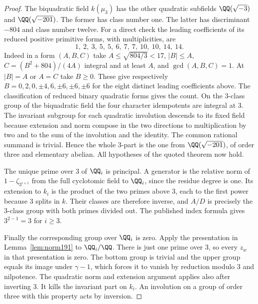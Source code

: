 \documentclass[a4paper,11pt]{article}
\theoremstyle{definition}
\theoremstyle{remark}
\numberwithin{equation}{section}
\begin{document}
\begin{proof}
The biquadratic field \(k(\mu_3)\) has the other quadratic
subfields \(\QQ(\sqrt{-3})\) and \(\QQ(\sqrt{-201})\).
The former has class number one. The latter has discriminant
\(-804\) and class number twelve. For a direct check the leading
coefficients of its reduced positive primitive forms, with
multiplicities, are
\[
        1,\ 2,\ 3,\ 5,\ 5,\ 6,\ 7,\ 7,\ 10,\ 10,\ 14,\ 14 .
\]
Indeed in a form \((A,B,C)\) take \(A\le\sqrt{804/3}<17\),
\(|B|\le A\), \(C=(B^2+804)/(4A)\) integral and at least \(A\),
and \(\gcd(A,B,C)=1\). At \(|B|=A\) or \(A=C\) take \(B\ge0\).
These give respectively \(B=0,2,0,\pm4,6,\pm6,\pm6,\pm6\)
for the eight distinct leading coefficients above. The
classification of reduced binary quadratic forms gives the count.
On the \(3\)-class group of the biquadratic field the four character
idempotents are integral at 3. The invariant subgroup for each
quadratic involution descends to its fixed field because extension and
norm compose in the two directions to multiplication by two
and to the sum of the involution and the identity. The common
rational summand is trivial. Hence the whole \(3\)-part is the
one from \(\QQ(\sqrt{-201})\), of order three and elementary
abelian. All hypotheses of the quoted theorem now hold.

The unique prime over 3 of \(\QQ_i\) is principal. A generator
is the relative norm of \(1-\zeta_{3^{i+1}}\) from the full
cyclotomic field to \(\QQ_i\), since the residue degree is one.
Its extension to \(k_i\) is the product of the two primes above
3, each to the first power because 3 splits in \(k\).
Their classes are therefore inverse, and \(A/D\) is precisely
the \(3\)-class group with both primes divided out. The published
index formula gives \(3^{2-1}=3\) for \(i\ge3\).

Finally the corresponding group over \(\QQ_i\) is zero. Apply
the presentation in Lemma~\ref{lem:norm191} to
\(\QQ_i/\QQ\). There is just one prime over 3, so every \(z_w\)
in that presentation is zero. The bottom group is trivial and
the upper group equals its image under \(\gamma-1\), which
forces it to vanish by reduction modulo 3 and nilpotence.
The quadratic norm and extension argument applies also after
inverting 3. It kills the invariant part on \(k_i\). An
involution on a group of order three with this property acts
by inversion.
\end{proof}
\end{document}
